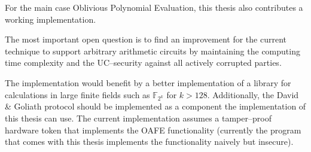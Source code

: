 For the main case Oblivious Polynomial Evaluation, this thesis also contributes
a working implementation.


%
%
\label{sec:outlook}

The most important open question is to find an improvement for the current
technique to support arbitrary arithmetic circuits by maintaining the computing
time complexity and the UC--security against all actively corrupted parties.

The implementation would benefit by a better implementation of a library for
calculations in large finite fields such as $\mathbb{F}_{2^{k}}$ for $k > 128$.
Additionally, the David \& Goliath protocol \cite{davidgoliath} should be
implemented as a component the implementation of this thesis can use. The
current implementation assumes a tamper--proof hardware token that implements
the OAFE functionality (currently the program \JWBtoken{} that comes with this
thesis implements the functionality naively but insecure).

